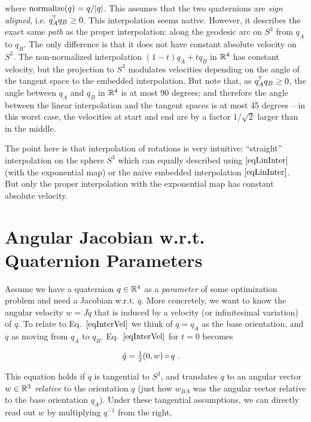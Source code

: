 where $\text{normalize}(q) = q / |q|$. This assumes that the two
quaternions are \emph{sign aligned}, i.e. $q_A^{\!\top\!} q_B \ge 0$. This
interpolation seems native. However, it describes the exact
same \emph{path} as the proper interpolation: along the geodesic arc
on $S^3$ from $q_A$ to $q_B$. The only difference  is that it does not have constant absolute velocity on
$S^3$. The non-normalized interpolation $(1-t) q_A + t q_B$ in
${\mathbb{R}}^4$ has constant velocity, but the projection to $S^3$ modulates
velocities depending on the angle of the tangent space to the
embedded interpolation. But note that, as $q_A^{\!\top\!} q_B \ge 0$, the
angle between $q_A$ and $q_B$ in ${\mathbb{R}}^4$ is at most 90 degrees; and
therefore the angle between the linear interpolation and the tangent
spaces is at most 45 degrees -- in this worst case, the velocities at start
and end are by a factor $1/\sqrt{2}$ larger than in the
middle.

The point here is that interpolation of rotations is very
intuitive: ``straight'' interpolation on the sphere $S^3$ which can
equally described using $\eqref{eqLinInter}$ (with the exponential
map) or the naive embedded interpolation $\eqref{eqLinInter}$. But only the proper
interpolation with the exponential map has constant absolute velocity.

\section{Angular Jacobian w.r.t. Quaternion Parameters}

Assume we have a quaternion $q\in{\mathbb{R}}^4$ as a \emph{parameter} of some
optimization problem and need a Jacobian w.r.t. $q$. More concretely,
we want to know the angular
velocity $w = J \dot q$ that is induced by a velocity (or infinitesimal
variation) of $q$. To relate to Eq.~$\eqref{eqInterVel}$ we think of
$q=q_A$ as the base orientation, and $\dot q$ as moving from $q_A$ to
$q_B$. Eq.~$\eqref{eqInterVel}$ for $t=0$ becomes

$$\begin{align}
\dot q &= \textstyle\frac12 (0, w) \circ q ~.
\end{align}$$

This equation holds if $\dot q$ is tangential to $S^3$, and translates
$\dot q$ to an angular vector $w\in{\mathbb{R}}^3$ \emph{relative} to the
orientation $q$ (just how $w_{BA}$ was the angular vector relative to
the base orientation $q_A$). Under these tangential assumptions, we
can directly read out $w$ by multiplying $q^{-1}$ from the right,

